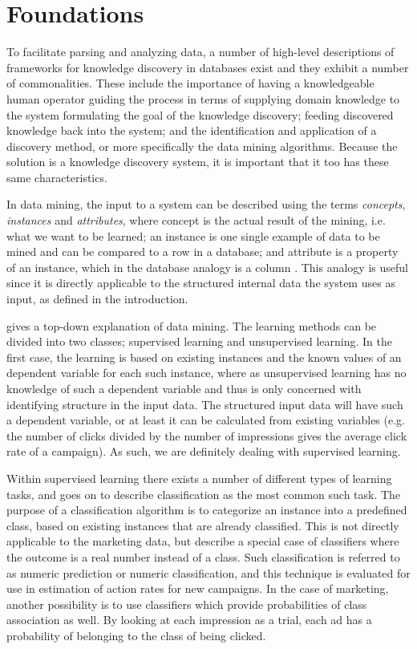 \documentclass{sig-alternate}
\begin{document}
\section{Foundations}
\label{ch:Foundations}
To facilitate parsing and analyzing data, a number of high-level descriptions of frameworks for knowledge discovery in databases exist \citep{Fayyad1996, Frawley1992} and they exhibit a number of commonalities. These include the importance of having a knowledgeable human operator guiding the process in terms of supplying domain knowledge to the system formulating the goal of the knowledge discovery; feeding discovered knowledge back into the system; and the identification and application of a discovery method, or more specifically the data mining algorithms. Because the solution is a knowledge discovery system, it is important that it too has these same characteristics.

In data mining, the input to a system can be described using the terms \emph{concepts}, \emph{instances} and \emph{attributes}, where concept is the actual result of the mining, i.e. what we want to be learned; an instance is one single example of data to be mined and can be compared to a row in a database; and attribute is a property of an instance, which in the database analogy is a column \citep{Witten2011}. This analogy is useful since it is directly applicable to the structured internal data the system uses as input, as defined in the introduction.

\cite{Kantardzic2011} gives a top-down explanation of data mining. The learning methods can be divided into two classes; supervised learning and unsupervised learning. In the first case, the learning is based on existing instances and the known values of an dependent variable for each such instance, where as unsupervised learning has no knowledge of such a dependent variable and thus is only concerned with identifying structure in the input data. The structured input data will have such a dependent variable, or at least it can be calculated from existing variables (e.g. the number of clicks divided by the number of impressions gives the average click rate of a campaign). As such, we are definitely dealing with supervised learning.

Within supervised learning there exists a number of different types of learning tasks, and \cite{Kantardzic2011} goes on to describe classification as the most common such task. The purpose of a classification algorithm is to categorize an instance into a predefined class, based on existing instances that are already classified. This is not directly applicable to the marketing data, but \citep{Witten2011} describe a special case of classifiers where the outcome is a real number instead of a class. Such classification is referred to as numeric prediction or numeric classification, and this technique is evaluated for use in estimation of action rates for new campaigns. In the case of marketing, another possibility is to use classifiers which provide probabilities of class association as well. By looking at each impression as a trial, each ad has a probability of belonging to the class of being clicked.
\end{document}
